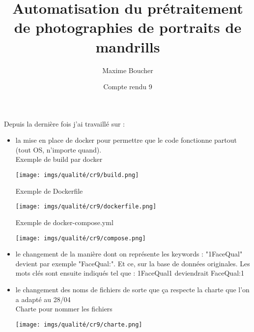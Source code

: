 \documentclass{article}
\title{Automatisation du prétraitement de photographies de portraits de mandrills}
\author{Maxime Boucher}
\date{Compte rendu 9}
\begin{document}
\maketitle

Depuis la dernière fois j'ai travaillé sur :
\begin{itemize}
\item la mise en place de docker pour permettre que le code fonctionne partout (tout OS, n'importe quand). \\

Exemple de build par docker
\begin{center}
    \texttt{[image: imgs/qualité/cr9/build.png]}
\end{center}

Exemple de Dockerfile
\begin{center}
    \texttt{[image: imgs/qualité/cr9/dockerfile.png]}
\end{center}

Exemple de docker-compose.yml
\begin{center}
    \texttt{[image: imgs/qualité/cr9/compose.png]}
\end{center}

\item le changement de la manière dont on représente les keywords : "1FaceQual" devient par exemple "FaceQual:". Et ce, sur la base de données originales. Les mots clés sont ensuite indiqués tel que : 1FaceQual1 deviendrait FaceQual:1

\item le changement des noms de fichiers de sorte que ça respecte la charte que l'on a adapté au 28/04 \\
Charte pour nommer les fichiers
\begin{center}
    \texttt{[image: imgs/qualité/cr9/charte.png]}
\end{center}
\end{itemize}
\end{document}
